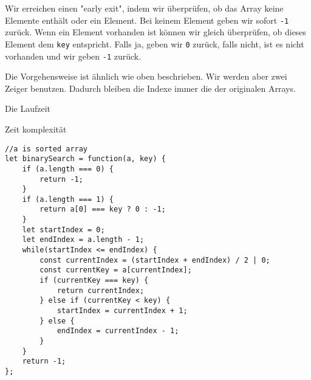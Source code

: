 \documentclass{book}
\begin{document}
Wir erreichen einen "early exit", indem wir überprüfen, ob das Array keine Elemente enthält oder ein Element. Bei keinem Element geben wir sofort \lstinline|-1| zurück. Wenn ein Element vorhanden ist können wir gleich überprüfen, ob dieses Element dem \lstinline|key| entspricht. Falls ja, geben wir \lstinline|0| zurück, falls nicht, ist es nicht vorhanden und wir geben \lstinline|-1| zurück.

Die Vorgehensweise ist ähnlich wie oben beschrieben. Wir werden aber zwei Zeiger benutzen. Dadurch bleiben die Indexe immer die der originalen Arrays.

Die Laufzeit

Zeit komplexität

\begin{lstlisting}[caption=My Javascript Example]
//a is sorted array
let binarySearch = function(a, key) {
	if (a.length === 0) {
		return -1;
	}
	if (a.length === 1) {
		return a[0] === key ? 0 : -1;
	}
	let startIndex = 0;
	let endIndex = a.length - 1;
	while(startIndex <= endIndex) {
		const currentIndex = (startIndex + endIndex) / 2 | 0;
		const currentKey = a[currentIndex];
		if (currentKey === key) {
			return currentIndex;
		} else if (currentKey < key) {
			startIndex = currentIndex + 1;
		} else {
			endIndex = currentIndex - 1;
		}
	}
	return -1;
};
\end{lstlisting}
\end{document}
